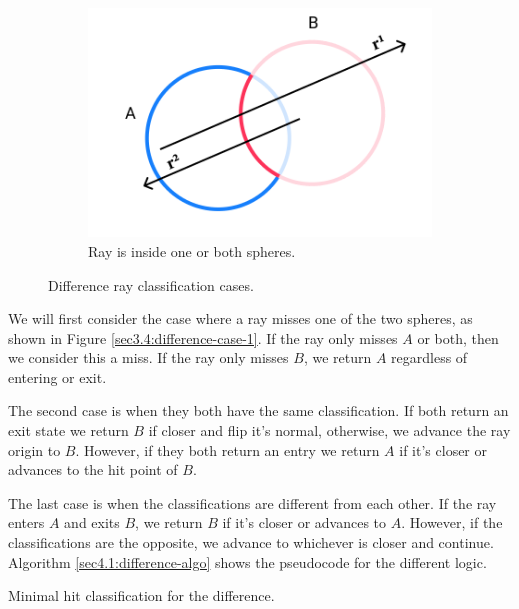 \documentclass[a4paper,11pt,oneside]{article}
\begin{document}
\begin{figure}[ht]
	\hfill
	\begin{subfigure}[b]{0.3\textwidth}
		\centering
		\includegraphics[width=\textwidth]{section4/4.1/difference-case-3.png}
		\caption{Ray is inside one or both spheres.}
		\label{sec3.4:difference-case-3}
	\end{subfigure}
	\caption{Difference ray classification cases.}
	\label{sec3.4:sphere-difference}
\end{figure}


We will first consider the case where a ray misses one of the two spheres, as shown in Figure \ref{sec3.4:difference-case-1}. If the ray only misses $A$ or both, then we consider this a miss. If the ray only misses $B$, we return $A$ regardless of entering or exit.

The second case is when they both have the same classification. If both return an exit state we return $B$ if closer and flip it's normal, otherwise, we advance the ray origin to $B$. However, if they both return an entry we return $A$ if it's closer or advances to the hit point of $B$.

The last case is when the classifications are different from each other. If the ray enters $A$ and exits $B$, we return $B$ if it's closer or advances to $A$. However, if the classifications are the opposite, we advance to whichever is closer and continue. Algorithm \ref{sec4.1:difference-algo} shows the pseudocode for the different logic.

\begin{algorithm}[H]
	\SetAlgoLined
	\caption{Minimal hit classification for the difference.}
	\label{sec4.1:difference_algo}
\end{algorithm} 
\end{document}
